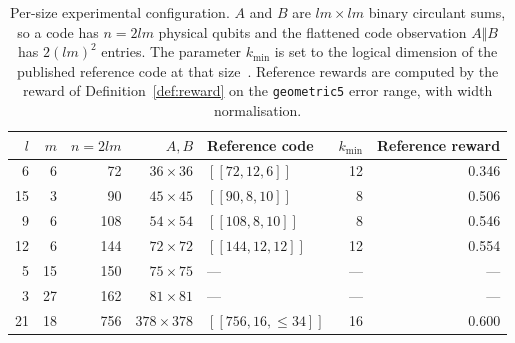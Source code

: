 \begin{table}[t]
  \centering
  \caption{Per-size experimental configuration. \(A\) and \(B\) are \(lm \times lm\)
  binary circulant sums, so a code has \(n = 2lm\) physical qubits and the flattened
  code observation \(A \Vert B\) has \(2(lm)^2\) entries. The parameter \(k_{\min}\) is set
  to the logical dimension of the published reference code at that
  size~\cite{bravyi2024high}. Reference rewards are
  computed by the reward of Definition~\ref{def:reward} on the \texttt{geometric5}
  error range, with width normalisation.}
  \label{tab:configuration}
  \begin{tabular}{rrrrlrr}
    \toprule
    \(l\) & \(m\) & \(n = 2lm\) & \(A, B\) & Reference code & \(k_{\min}\) & Reference reward \\
    \midrule
     6 &  6 &  72 & \(36\times36\)   & \([[72,12,6]]\)       & 12 & 0.346 \\
    15 &  3 &  90 & \(45\times45\)   & \([[90,8,10]]\)       &  8 & 0.506 \\
     9 &  6 & 108 & \(54\times54\)   & \([[108,8,10]]\)      &  8 & 0.546 \\
    12 &  6 & 144 & \(72\times72\)   & \([[144,12,12]]\)     & 12 & 0.554 \\
     5 & 15 & 150 & \(75\times75\)   & ---                   & ---& --- \\
     3 & 27 & 162 & \(81\times81\)   & ---                   & ---& --- \\
    21 & 18 & 756 & \(378\times378\) & \([[756,16,\leq34]]\) & 16 & 0.600 \\
    \bottomrule
  \end{tabular}
\end{table}